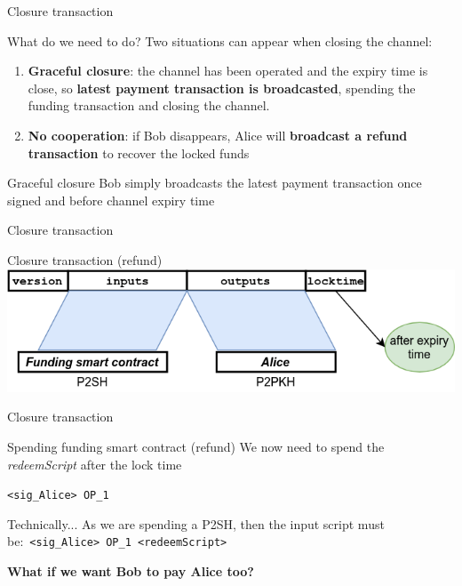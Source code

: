 \documentclass{beamer}
\begin{document}
\begin{frame}{Closure transaction}
 \begin{block}{What do we need to do?}
  Two situations can appear when closing the channel:
  \begin{enumerate}[<+->]
   \item \textbf{Graceful closure}: the channel has been operated and the expiry time is close, so \textbf{latest payment transaction is broadcasted}, spending the funding transaction and closing the channel.
   \item \textbf{No cooperation}: if Bob disappears, Alice will \textbf{broadcast a refund transaction} to recover the locked funds
  \end{enumerate}
 \end{block}
 \pause
 \begin{exampleblock}{Graceful closure}
  Bob simply broadcasts the latest payment transaction once signed and before channel expiry time
 \end{exampleblock}
\end{frame}
\begin{frame}{Closure transaction}
 \begin{exampleblock}{Closure transaction (refund)}
  \includegraphics[width=\textwidth, height=0.8\textheight, keepaspectratio]{img/unidir_tx_refund.png}
 \end{exampleblock}
\end{frame}
\begin{frame}{Closure transaction}
 \begin{exampleblock}{Spending funding smart contract (refund)}
  We now need to spend the \textit{redeemScript} after the lock time
  \pause
  \begin{center}
   \texttt{<sig\_Alice> OP\_1}
  \end{center}
 \end{exampleblock}
 \pause
 \begin{exampleblock}{Technically...}
  As we are spending a P2SH, then the input script must be:\
  \texttt{<sig\_Alice> OP\_1 <redeemScript>}
 \end{exampleblock}
\end{frame}
\begin{frame}
 \begin{center}
  \textbf{What if we want Bob to pay Alice too?}
 \end{center}
\end{frame}
\end{document}
